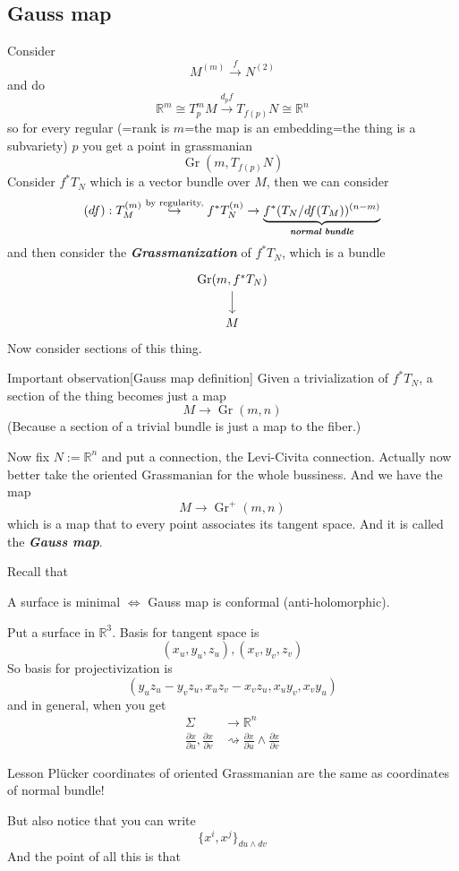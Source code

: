 \subsection{Gauss map}
Consider 
\[M^{(m)}\xrightarrow{f}N^{(2)}\]
and do
\[\mathbb{R}^m \cong T_p^m M \xrightarrow{d_pf}T_{f(p)}N \cong \mathbb{R}^n\]
so for every regular (=rank is \(m\)=the map is an embedding=the thing is a subvariety) \(p\) you get a point in grassmanian
\[\operatorname{Gr}(m,T_{f(p)}N)\]
Consider \(f^*T_N\) which is a vector bundle over \(M\), then we can consider
\[(df):T^{(m)}_M \overset{\text{by regularity,} }{\hookrightarrow } f^*T^{(n)}_N \to \underbrace{f^*(T_N / df(T_M))^{(n-m)}}_{\text{\textit{\textbf{normal bundle}}} }\]
and then consider the \textit{\textbf{Grassmanization}} of \(f^*T_N\), which is a bundle
\[\begin{tikzcd}
\operatorname{Gr}(m,f^*T_N)\arrow[d]\\
M
\end{tikzcd}\]
Now consider sections of this thing.

\begin{thing7}{Important observation}[Gauss map definition]\leavevmode
 Given a trivialization of \(f^*T_N\), a section of the thing becomes just a map
 \[M \to \operatorname{Gr}(m,n)\]
 (Because a section of a trivial bundle is just a map to the fiber.) 
\end{thing7}

Now fix \(N:= \mathbb{R}^n\) and put a connection, the Levi-Civita connection. Actually now better take the oriented Grassmanian for the whole bussiness. And we have the map
\[M \to \operatorname{Gr}^+(m,n)\]
which is a map that to every point associates its tangent space. And it is called the \textit{\textbf{Gauss map}}.

Recall that
\begin{claim}\leavevmode
A surface is minimal \(\iff\) Gauss map is conformal (anti-holomorphic).
\end{claim}

Put a surface in \(\mathbb{R}^3\). Basis for tangent space is
\[(x_u,y_u,z_u), (x_v,y_v,z_v)\]
So basis for projectivization is
\[(y_uz_u-y_vz_u, x_uz_v-x_vz_u,x_uy_v,x_vy_u)\]
and in general, when you get
\begin{align*}
\Sigma&\to \mathbb{R}^n\\
\frac{\partial x}{\partial u}, \frac{\partial x}{\partial v} &\rightsquigarrow \frac{\partial x}{\partial u}\wedge \frac{\partial x}{\partial v}
\end{align*}
\begin{thing8}{Lesson}\leavevmode
Plücker coordinates of oriented Grassmanian are the same as coordinates of normal bundle!
\end{thing8}
But also notice that you can write
\[\{x^i,x^j\}_{du \wedge dv}\]
And the point of all this is that 

